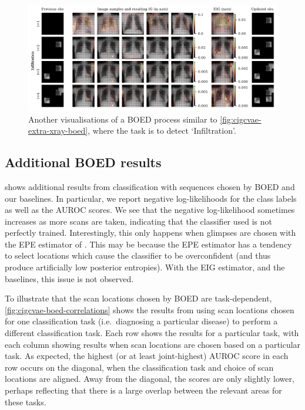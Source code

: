 \begin{figure}[t]
  \centering
  \includegraphics[width=\textwidth]{figs/cigcvae/boed-visualisation-4980-compressed.pdf}
  \caption{Another visualisations of a BOED process similar to \cref{fig:cigcvae-extra-xray-boed}, where the task is to detect `Infiltration'.}
\label{fig:cigcvae-extra-xray-boed-extra}
\end{figure}

\subsection{Additional BOED results} \label{supp:cigcvae-boed-results}
 shows additional results from classification with
sequences chosen by BOED and our baselines. In particular, we report negative
log-likelihoods for the class labels as well as the AUROC scores. We see that
the negative log-likelihood sometimes increases as more scans are taken,
indicating that the classifier used is not perfectly trained. Interestingly,
this only happens when glimpses are chosen with the EPE estimator of
\citet{harvey2019near}. This may be because the EPE estimator has a tendency to
select locations which cause the classifier to be overconfident (and thus
produce artificially low posterior entropies). With the EIG estimator, and the
baselines, this issue is not observed.

To illustrate that the scan locations chosen by BOED are task-dependent,
\cref{fig:cigcvae-boed-correlations} shows the results from using scan locations chosen
for one classification task (i.e.~diagnosing a particular disease) to perform a
different classification task. Each row shows the results for a particular task,
with each column showing results when scan locations are chosen based on a
particular task. As expected, the highest (or at least joint-highest) AUROC
score in each row occurs on the diagonal, when the classification task and
choice of scan locations are aligned. Away from the diagonal, the scores are
only slightly lower, perhaps reflecting that there is a large overlap between
the relevant areas for these tasks.

